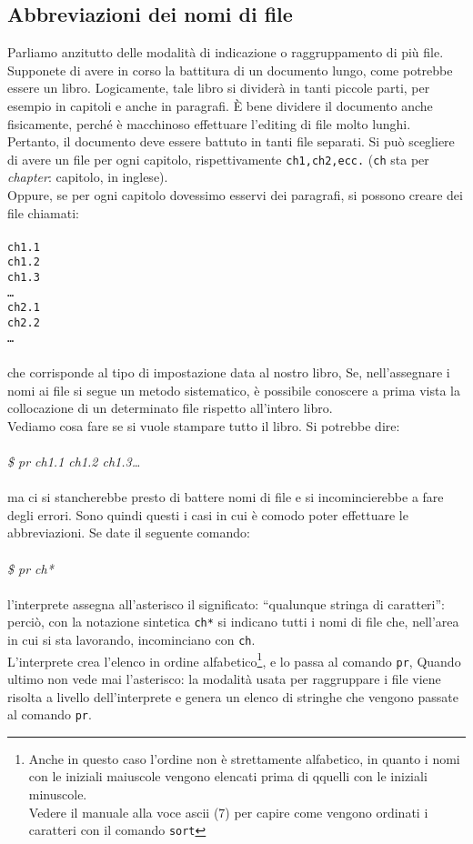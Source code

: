 \subsection{Abbreviazioni dei nomi di file}
Parliamo anzitutto delle modalità di indicazione o raggruppamento di più file.
Supponete di avere in corso la battitura di un documento lungo, come potrebbe
essere un libro. Logicamente, tale libro si dividerà in tanti piccole parti,
per esempio in capitoli e anche in paragrafi. È bene dividere il documento
anche fisicamente, perché è macchinoso effettuare l'editing di file molto
lunghi. Pertanto, il documento deve essere battuto in tanti file separati. Si
può scegliere di avere un file per ogni capitolo, rispettivamente
\texttt{ch1,ch2,ecc.} (\texttt{ch} sta per \textit{chapter}: capitolo, in
inglese).\\ 
Oppure, se per ogni capitolo dovessimo esservi dei paragrafi, si possono creare
dei file chiamati:\\\\
{\tt ch1.1\\ ch1.2\\ ch1.3 \\ \dots\\ ch2.1\\ ch2.2\\ \dots}\\\\
che corrisponde al tipo di impostazione data al nostro libro, Se,
nell'assegnare i nomi ai file si segue un metodo sistematico, è possibile
conoscere a prima vista la collocazione di un determinato file rispetto
all'intero libro.\\
Vediamo cosa fare se si vuole stampare tutto il libro. Si potrebbe dire:\\\\
\textit{\$ pr ch1.1 ch1.2 ch1.3\dots}\\\\
ma ci si stancherebbe presto di battere nomi di file e si incomincierebbe a
fare degli errori. Sono quindi questi i casi in cui è comodo poter effettuare
le abbreviazioni. Se date il seguente comando:\\\\
\textit{\$ pr ch*}\\\\
l'interprete assegna all'asterisco il significato: ``qualunque stringa di
caratteri'': perciò, con la notazione sintetica \texttt{ch*} si indicano tutti
i nomi di file che, nell'area in cui si sta lavorando, incominciano con
\texttt{ch}.\\
L'interprete crea l'elenco in ordine alfabetico\footnote{Anche in questo caso
l'ordine non è strettamente alfabetico, in quanto i nomi con le iniziali
maiuscole vengono elencati prima di qquelli con le iniziali minuscole.\\ Vedere
il manuale alla voce ascii (7) per capire come vengono ordinati i caratteri con
il comando \texttt{sort}}, e lo passa al comando \texttt{pr}, Quando ultimo non
vede mai l'asterisco: la modalità usata per raggruppare i file viene risolta a
livello dell'interprete e genera un elenco di stringhe che vengono passate al
comando \texttt{pr}.
